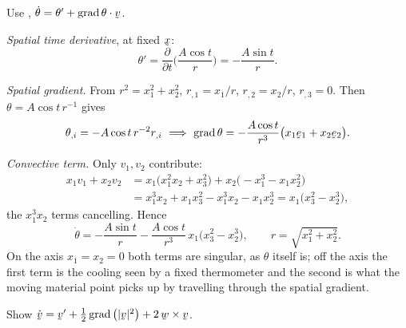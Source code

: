 \begin{solution}
Use , $\dot\theta=\theta'+\ip{\grad\theta}{\bv}$.

\emph{Spatial time derivative}, at fixed $\bx$:
\[
   \theta'=\frac{\partial}{\partial t}\Big(\frac{A\cos t}{r}\Big)
   =-\frac{A\sin t}{r}.
\]

\emph{Spatial gradient.} From $r^{2}=x_{1}^{2}+x_{2}^{2}$,
$r_{,1}=x_{1}/r$, $r_{,2}=x_{2}/r$, $r_{,3}=0$. Then
$\theta=A\cos t\,r^{-1}$ gives
\[
   \theta_{,i}=-A\cos t\,r^{-2}r_{,i}
   \ \Longrightarrow\
   \grad\theta=-\frac{A\cos t}{r^{3}}\big(x_{1}\be_{1}+x_{2}\be_{2}\big).
\]

\emph{Convective term.} Only $v_{1},v_{2}$ contribute:
\[
\begin{aligned}
   x_{1}v_{1}+x_{2}v_{2}
   &=x_{1}\big(x_{1}^{2}x_{2}+x_{3}^{2}\big)
     +x_{2}\big(-x_{1}^{3}-x_{1}x_{2}^{2}\big)\\
   &=x_{1}^{3}x_{2}+x_{1}x_{3}^{2}-x_{1}^{3}x_{2}-x_{1}x_{2}^{3}
    =x_{1}\big(x_{3}^{2}-x_{2}^{3}\big),
\end{aligned}
\]
the $x_{1}^{3}x_{2}$ terms cancelling. Hence
\[
   \boxed{\ \dot\theta=-\frac{A\sin t}{r}
   -\frac{A\cos t}{r^{3}}\,x_{1}\big(x_{3}^{2}-x_{2}^{3}\big),
   \qquad r=\sqrt{x_{1}^{2}+x_{2}^{2}}.\ }
\]
On the axis $x_{1}=x_{2}=0$ both terms are singular, as $\theta$ itself
is; off the axis the first term is the cooling seen by a fixed
thermometer and the second is what the moving material point picks up by
travelling through the spatial gradient.
\end{solution}

\begin{problem}
Show $\dot\bv=\bv'+\tfrac12\grad\big(|\bv|^{2}\big)+2\,\bw\times\bv$.
\end{problem}

